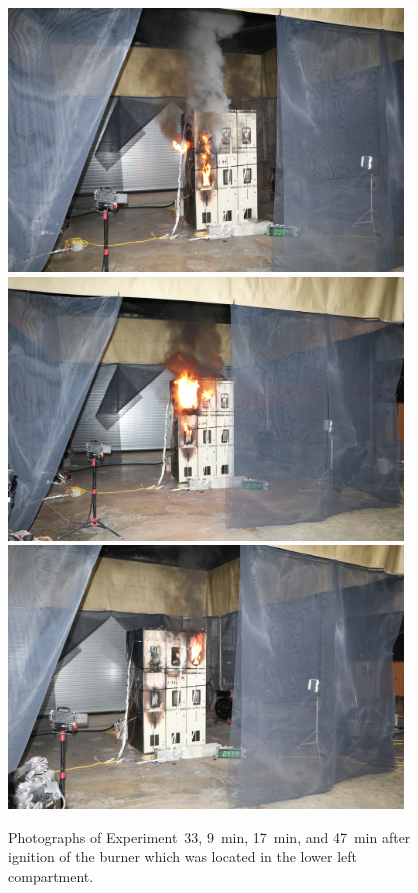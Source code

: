 \begin{figure}[p]
\centering
\includegraphics[height=2.75in]{../FIGURES/Test_33_9_min} \\
\includegraphics[height=2.75in]{../FIGURES/Test_33_17_min} \\
\includegraphics[height=2.75in]{../FIGURES/Test_33_47_min}
\caption[Photographs of Experiment~33]{Photographs of Experiment~33, 9~min, 17~min, and 47~min after ignition of the burner which was located in the lower left compartment.}
\label{fig:Test_33_photos}
\end{figure}



